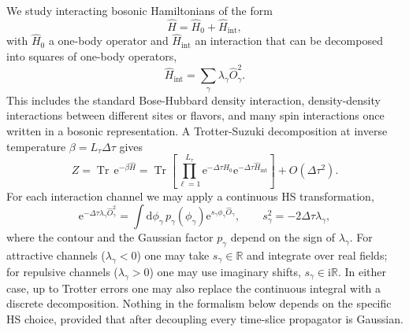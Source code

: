\documentclass[twocolumn,aps,prb,10pt,amsmath,amssymb,amsthm,superscriptaddress]{revtex4-2}
\newcommand{\Tr}{\operatorname{Tr}}
\newcommand{\dd}{\mathrm{d}}
\newcommand{\ee}{\mathrm{e}}
\newcommand{\ii}{\mathrm{i}}
\theoremstyle{remark}
\begin{document}
We study interacting bosonic Hamiltonians of the form
\begin{equation}
    \hat H = \hat H_0 + \hat H_{\mathrm{int}},
\end{equation}
with $\hat H_0$ a one-body operator and $\hat H_{\mathrm{int}}$ an interaction that can be decomposed into squares of one-body operators,
\begin{equation}
    \hat H_{\mathrm{int}} = \sum_\gamma \lambda_\gamma \hat O_\gamma^2.
    \label{eq:hint_square}
\end{equation}
This includes the standard Bose-Hubbard density interaction, density-density interactions between different sites or flavors, and many spin interactions once written in a bosonic representation. A Trotter-Suzuki decomposition at inverse temperature $\beta=L_\tau\Delta\tau$ gives
\begin{equation}
    Z = \Tr\,\ee^{-\beta \hat H}
    = \Tr\left[\prod_{\ell=1}^{L_\tau} \ee^{-\Delta\tau \hat H_0}\ee^{-\Delta\tau \hat H_{\mathrm{int}}}\right]
    + O(\Delta\tau^2).
\end{equation}
For each interaction channel we may apply a continuous HS transformation,
\begin{equation}
    \ee^{-\Delta\tau \lambda_\gamma \hat O_\gamma^2}
    = \int \dd\phi_\gamma\, p_\gamma(\phi_\gamma)
    \ee^{s_\gamma \phi_\gamma \hat O_\gamma},
    \qquad
    s_\gamma^2 = -2\Delta\tau\lambda_\gamma,
    \label{eq:hs_generic}
\end{equation}
where the contour and the Gaussian factor $p_\gamma$ depend on the sign of $\lambda_\gamma$. For attractive channels ($\lambda_\gamma<0$) one may take $s_\gamma\in\mathbb R$ and integrate over real fields; for repulsive channels ($\lambda_\gamma>0$) one may use imaginary shifts, $s_\gamma\in\ii\mathbb R$. In either case, up to Trotter errors one may also replace the continuous integral with a discrete decomposition. Nothing in the formalism below depends on the specific HS choice, provided that after decoupling every time-slice propagator is Gaussian.
\end{document}
